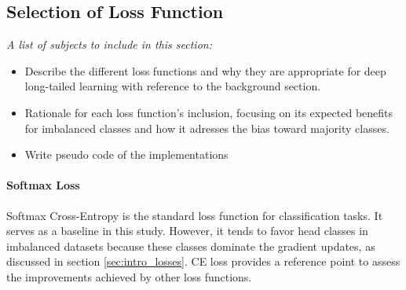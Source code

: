\subsection{Selection of Loss Function}
\label{sec:loss_selection}
\textit{A list of subjects to include in this section:}

 \begin{itemize}
    \item Describe the different loss functions and why they are appropriate for deep long-tailed learning with reference to the background section.
    \item Rationale for each loss function's inclusion, focusing on its expected benefits for imbalanced classes and how it adresses the bias toward majority classes.
    \item Write pseudo code of the implementations
 \end{itemize}

 

 \paragraph{Softmax Loss}

Softmax Cross-Entropy is the standard loss function for classification tasks. It serves as a baseline in this study. However, it tends to favor head classes in imbalanced datasets because these classes dominate the gradient updates, as discussed in section \ref{sec:intro_losses}. CE loss provides a reference point to assess the improvements achieved by other loss functions.


